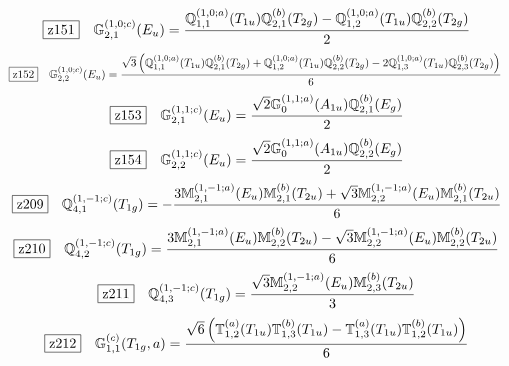 \documentclass[fleqn,10pt,landscape]{jsarticle}
\begin{document}
\begin{dmath*}
\hspace*{3mm}\fbox{z151}\quad \mathbb{G}_{2,1}^{(1,0;c)}(E_{u})=\frac{\mathbb{Q}_{1,1}^{(1,0;a)}(T_{1u}) \mathbb{Q}_{2,1}^{(b)}(T_{2g}) - \mathbb{Q}_{1,2}^{(1,0;a)}(T_{1u}) \mathbb{Q}_{2,2}^{(b)}(T_{2g})}{2}
\end{dmath*}
\begin{dmath*}
\hspace*{3mm}\fbox{z152}\quad \mathbb{G}_{2,2}^{(1,0;c)}(E_{u})=\frac{\sqrt{3} \left(\mathbb{Q}_{1,1}^{(1,0;a)}(T_{1u}) \mathbb{Q}_{2,1}^{(b)}(T_{2g}) + \mathbb{Q}_{1,2}^{(1,0;a)}(T_{1u}) \mathbb{Q}_{2,2}^{(b)}(T_{2g}) - 2 \mathbb{Q}_{1,3}^{(1,0;a)}(T_{1u}) \mathbb{Q}_{2,3}^{(b)}(T_{2g})\right)}{6}
\end{dmath*}
\begin{dmath*}
\hspace*{3mm}\fbox{z153}\quad \mathbb{G}_{2,1}^{(1,1;c)}(E_{u})=\frac{\sqrt{2} \mathbb{G}_{0}^{(1,1;a)}(A_{1u}) \mathbb{Q}_{2,1}^{(b)}(E_{g})}{2}
\end{dmath*}
\begin{dmath*}
\hspace*{3mm}\fbox{z154}\quad \mathbb{G}_{2,2}^{(1,1;c)}(E_{u})=\frac{\sqrt{2} \mathbb{G}_{0}^{(1,1;a)}(A_{1u}) \mathbb{Q}_{2,2}^{(b)}(E_{g})}{2}
\end{dmath*}
\begin{dmath*}
\hspace*{3mm}\fbox{z209}\quad \mathbb{Q}_{4,1}^{(1,-1;c)}(T_{1g})=- \frac{3 \mathbb{M}_{2,1}^{(1,-1;a)}(E_{u}) \mathbb{M}_{2,1}^{(b)}(T_{2u}) + \sqrt{3} \mathbb{M}_{2,2}^{(1,-1;a)}(E_{u}) \mathbb{M}_{2,1}^{(b)}(T_{2u})}{6}
\end{dmath*}
\begin{dmath*}
\hspace*{3mm}\fbox{z210}\quad \mathbb{Q}_{4,2}^{(1,-1;c)}(T_{1g})=\frac{3 \mathbb{M}_{2,1}^{(1,-1;a)}(E_{u}) \mathbb{M}_{2,2}^{(b)}(T_{2u}) - \sqrt{3} \mathbb{M}_{2,2}^{(1,-1;a)}(E_{u}) \mathbb{M}_{2,2}^{(b)}(T_{2u})}{6}
\end{dmath*}
\begin{dmath*}
\hspace*{3mm}\fbox{z211}\quad \mathbb{Q}_{4,3}^{(1,-1;c)}(T_{1g})=\frac{\sqrt{3} \mathbb{M}_{2,2}^{(1,-1;a)}(E_{u}) \mathbb{M}_{2,3}^{(b)}(T_{2u})}{3}
\end{dmath*}
\begin{dmath*}
\hspace*{3mm}\fbox{z212}\quad \mathbb{G}_{1,1}^{(c)}(T_{1g},a)=\frac{\sqrt{6} \left(\mathbb{T}_{1,2}^{(a)}(T_{1u}) \mathbb{T}_{1,3}^{(b)}(T_{1u}) - \mathbb{T}_{1,3}^{(a)}(T_{1u}) \mathbb{T}_{1,2}^{(b)}(T_{1u})\right)}{6}
\end{dmath*}
\end{document}
